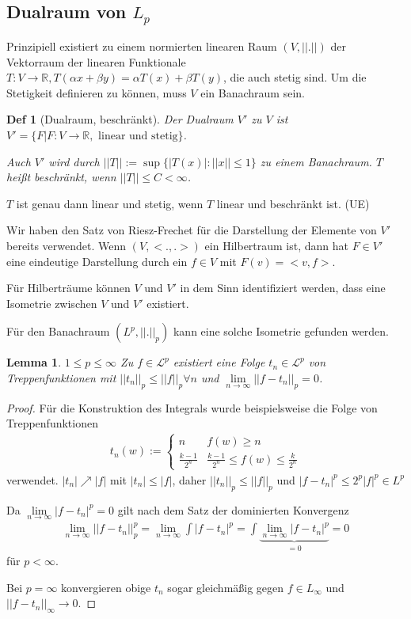 \documentclass[]{article}
\newtheorem{lemma}{Lemma}
\newtheorem*{definition*}{Def}
\begin{document}
\subsection{Dualraum von $L_p$}
Prinzipiell existiert zu einem normierten linearen Raum $(V, ||.||)$ der Vektorraum der linearen Funktionale $T:V\rightarrow\mathbb{R}, T(\alpha x + \beta y) = \alpha T(x) + \beta T(y)$, die auch stetig sind. Um die Stetigkeit definieren zu können, muss $V$ ein Banachraum sein.

\begin{definition*}[Dualraum, beschränkt]
	Der Dualraum $V'$ zu $V$ ist $V'=\{F | F:V\rightarrow\mathbb{R}, \text{ linear und stetig}\}$.
	
	Auch $V'$ wird durch $||T|| := \sup\{|T(x)| : ||x|| \leq 1\}$ zu einem Banachraum. $T$ heißt beschränkt, wenn $||T|| \leq C < \infty$.
\end{definition*}

$T$ ist genau dann linear und stetig, wenn $T$ linear und beschränkt ist. (UE)

Wir haben den Satz von Riesz-Frechet für die Darstellung der Elemente von $V'$ bereits verwendet. Wenn $(V,<.,.>)$ ein Hilbertraum ist, dann hat $F\in V'$ eine eindeutige Darstellung durch ein $f\in V$ mit $F(v) = <v,f>$.

Für Hilberträume können $V$ und $V'$ in dem Sinn identifiziert werden, dass eine Isometrie zwischen $V$ und $V'$ existiert.

Für den Banachraum $(L^p, ||.||_p)$ kann eine solche Isometrie gefunden werden.

\begin{lemma}
	$1 \leq p \leq \infty$ Zu $f\in \mathcal{L}^p$ existiert eine Folge $t_n \in \mathcal{L}^p$ von Treppenfunktionen mit $||t_n||_p \leq ||f||_p \forall n$ und $\lim\limits_{n\rightarrow\infty}||f-t_n||_p = 0$.
\end{lemma}
\begin{proof}
	Für die Konstruktion des Integrals wurde beispielsweise die Folge von Treppenfunktionen
	\begin{align*}
		t_n(w):= \begin{cases}
			n & f(w)\geq n\\
			\frac{k-1}{2^n} & \frac{k-1}{2^n} \leq f(w) \leq \frac{k}{2^n}
		\end{cases}
	\end{align*}
	verwendet. $|t_n|\nearrow |f|$ mit $|t_n| \leq |f|$, daher $||t_n||_p \leq ||f||_p$ und $|f-t_n|^p \leq 2^p |f|^p \in L^p$
	
	Da $\lim\limits_{n\rightarrow\infty}|f-t_n|^p=0$ gilt nach dem Satz der dominierten Konvergenz
	\begin{align*}
		\lim\limits_{n\rightarrow\infty} ||f-t_n||^p_p = \lim\limits_{n\rightarrow\infty} \int|f-t_n|^p = \int \underbrace{\lim\limits_{n\rightarrow\infty}|f-t_n|^p}_{=0} = 0
	\end{align*}
	für $p <\infty$.
	
	Bei $p=\infty$ konvergieren obige $t_n$ sogar gleichmäßig gegen $f\in L_\infty$ und $||f-t_n||_\infty \rightarrow 0$.
\end{proof}
\end{document}
